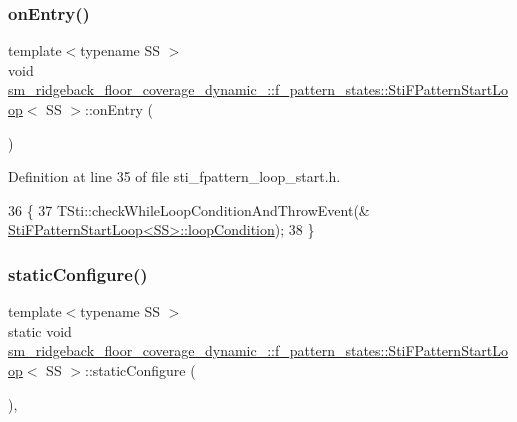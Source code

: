 \subsubsection{\texorpdfstring{on\+Entry()}{onEntry()}}
{\footnotesize\ttfamily template$<$typename SS $>$ \\
void \hyperlink{structsm__ridgeback__floor__coverage__dynamic__1_1_1f__pattern__states_1_1StiFPatternStartLoop}{sm\+\_\+ridgeback\+\_\+floor\+\_\+coverage\+\_\+dynamic\+\_\+::f\+\_\+pattern\+\_\+states\+::\+Sti\+F\+Pattern\+Start\+Loop}$<$ SS $>$\+::on\+Entry (\begin{DoxyParamCaption}{ }\end{DoxyParamCaption})\hspace{0.3cm}{\ttfamily [inline]}}



Definition at line 35 of file sti\+\_\+fpattern\+\_\+loop\+\_\+start.\+h.


\begin{DoxyCode}
36   \{
37     TSti::checkWhileLoopConditionAndThrowEvent(&
      \hyperlink{structsm__ridgeback__floor__coverage__dynamic__1_1_1f__pattern__states_1_1StiFPatternStartLoop_a47c1d55fa4fc153703903a92353e32ac}{StiFPatternStartLoop<SS>::loopCondition});
38   \}
\end{DoxyCode}
\mbox{\label{structsm__ridgeback__floor__coverage__dynamic__1_1_1f__pattern__states_1_1StiFPatternStartLoop_ac8d6f4f39364c32cafb39cfe8ec2c939}} 
\subsubsection{\texorpdfstring{static\+Configure()}{staticConfigure()}}
{\footnotesize\ttfamily template$<$typename SS $>$ \\
static void \hyperlink{structsm__ridgeback__floor__coverage__dynamic__1_1_1f__pattern__states_1_1StiFPatternStartLoop}{sm\+\_\+ridgeback\+\_\+floor\+\_\+coverage\+\_\+dynamic\+\_\+::f\+\_\+pattern\+\_\+states\+::\+Sti\+F\+Pattern\+Start\+Loop}$<$ SS $>$\+::static\+Configure (\begin{DoxyParamCaption}{ }\end{DoxyParamCaption})\hspace{0.3cm}{\ttfamily [inline]}, {\ttfamily [static]}}



